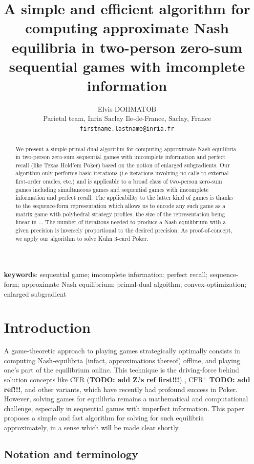 \documentclass{article} %
\title{
  A simple and efficient algorithm for computing approximate
  Nash equilibria in two-person zero-sum sequential games with imcomplete
  information}
\author{Elvis DOHMATOB
\\Parietal team, Inria Saclay Ile-de-France, Saclay, France
\\\texttt{firstname.lastname@inria.fr}
}
\begin{document}
\maketitle
\begin{abstract}We present a simple primal-dual algorithm for
  computing approximate Nash equilibria in two-person zero-sum
  sequential games with  imcomplete information and perfect recall
  (like Texas Hold'em Poker) based on the notion of enlarged
  subgradients. Our algorithm only performs basic iterations (i.e
  iterations involving no calls to external first-order oracles, etc.)
  and is applicable to a broad class of two-person zero-sum games
  including simultaneous games and sequential games with imcomplete
  information and perfect recall. The applicability to the latter kind
  of games is thanks to the sequence-form representation
  \cite{koller1992complexity} which allows us to encode any such game
  as a matrix game with polyhedral strategy profiles, the size of the
  representation being linear in ... The number of iterations needed
  to produce a Nash equilibrium with a given precision is inversely
  proportional to the desired precision. As proof-of-concept, we apply our
  algorithm to solve Kuhn 3-card Poker.
\end{abstract}

\textbf{keywords}: sequential game; imcomplete information; perfect
recall; sequence-form; approximate Nash equilibrium; primal-dual
algoithm; convex-optimization; enlarged subgradient

\section{Introduction}
\label{sec:intro}
A game-theoretic approach to playing games strategically optimally
consists in computing Nash-equilibria (infact, approximations thereof)
offline, and playing one's part of the equilibrium online. This
technique is the driving-force behind solution concepts like CFR
(\textbf{TODO: add Z.'s ref first!!!}) \cite{lanctot2009monte},
$\text{CFR}^{+}$ \textbf{TODO: add ref!!!}, and other variants, which
have recently had profound success in Poker. However, solving games
for equilibria remains a mathematical and computational challenge,
especially in sequential games with imperfect information. This paper
proposes a simple and fast algorithm for solving for such equilibria
approximately, in a sense which will be made clear shortly.

\subsection{Notation and terminology}
\end{document}
